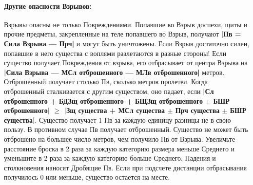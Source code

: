 \paragraph{Другие опасности Взрывов:} Взрывы опасны не только Повреждениями. Попавшие во Взрыв доспехи, щиты и прочие предметы, закрепленные на теле попавшего во Взрыв, получают \textbf{|Пв = Сила Взрыва — Прч|} и могут быть уничтожены. Если Взрыв достаточно силен, попавшие в него существа с воплями разлетаются в разные стороны! Если существо получает Повреждения от взрыва, его отбрасывает от центра Взрыва на \textbf{|Сила Взрыва — МСл отброшенного — МЛв отброшенного|} метров. Отброшенный получает столько Пв, сколько метров пролетел. Когда отброшенный сталкивается с другим существом, оно падает, если \textbf{|Сл отброшенного + БДЗщ отброшенного + БЩЗщ отброшенного $\pm$ БШР отброшенного| $\geq$ |Зщ существа + МСл существа $\pm$ Прч существа $\pm$ БШР существа|}. Существо получает 1 Пв за каждую единицу разницы не в свою пользу. В противном случае Пв получает отброшенный. Существо не может быть отброшено на большее число метров, чем получило Пв от Взрыва. Увеличьте расстояние броска в 2 раза за каждую категорию размера меньше Среднего и уменьшите в 2 раза за каждую категорию больше Среднего. Падения и столкновения наносят Дробящие Пв.
\newline
Если при подсчете дистанции отбрасывания получилось 0 или меньше, существо остается на месте.
